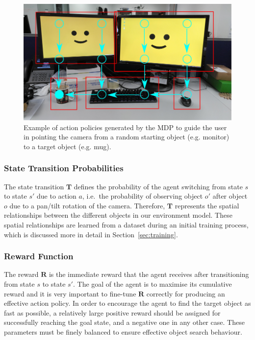 \documentclass[a4paper, twoside]{article}
\begin{document}
\begin{figure}
  \centering
  \includegraphics[width=\columnwidth]{../figures/office_desk_example.png}
  \caption{Example of action policies generated by the MDP to guide the user in pointing the camera from a random starting object (e.g. monitor) to a target object (e.g. mug). }\label{fig:route-example}
\end{figure}

\subsubsection{State Transition Probabilities}

\noindent The state transition $\mathbf{T}$ defines the probability of the agent switching from state $s$ to state $s'$ due to action $a$, i.e.\ the probability of observing object $o'$ after object $o$ due to a pan/tilt rotation of the camera. Therefore, $\mathbf{T}$ represents the spatial relationships between the different objects in our environment model. 
% 
These spatial relationships are learned from a dataset during an initial training process, which is discussed more in detail in Section~\ref{sec:training}.

\subsubsection{Reward Function}

\noindent The reward $\mathbf{R}$ is the immediate reward that the agent receives after transitioning from state $s$ to state $s'$.
% 
% 
The goal of the agent is to maximise its cumulative reward and it is very important to fine-tune $\mathbf{R}$ correctly for producing an effective action policy. In order to encourage the agent to find the target object as fast as possible, a relatively large positive reward should be assigned for successfully reaching the goal state, and a negative one in any other case. These parameters must be finely balanced to ensure effective object search behaviour.
\end{document}
